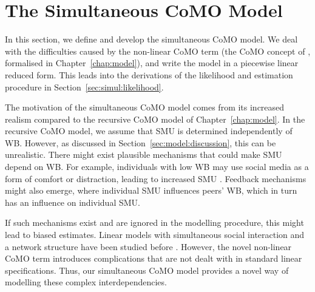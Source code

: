 \section{The Simultaneous CoMO Model}
\label{sec:simul:model}
In this section, we define and develop the simultaneous CoMO model. We deal with the difficulties caused by the non-linear CoMO term (the CoMO concept of \textcite[Eqs.~1--2]{DahlFoldnesGronneberg2024}, formalised in Chapter~\ref{chap:model}), and write the model in a piecewise linear reduced form. This leads into the derivations of the likelihood and estimation procedure in Section~\ref{sec:simul:likelihood}.

The motivation of the simultaneous CoMO model comes from its increased realism compared to the recursive CoMO model of Chapter~\ref{chap:model}. In the recursive CoMO model, we assume that SMU is determined independently of WB\@. However, as discussed in Section~\ref{sec:model:discussion}, this can be unrealistic. There might exist plausible mechanisms that could make SMU depend on WB\@. For example, individuals with low WB may use social media as a form of comfort or distraction, leading to increased SMU \parencite[see, e.g.,][on compensatory internet use]{KardefeltWinther2014}. Feedback mechanisms might also emerge, where individual SMU influences peers' WB, which in turn has an influence on individual SMU\@.

If such mechanisms exist and are ignored in the modelling procedure, this might lead to biased estimates. Linear models with simultaneous social interaction and a network structure have been studied before \parencite[e.g.,][]{Lee2010}. However, the novel non-linear CoMO term introduces complications that are not dealt with in standard linear specifications. Thus, our simultaneous CoMO model provides a novel way of modelling these complex interdependencies.

